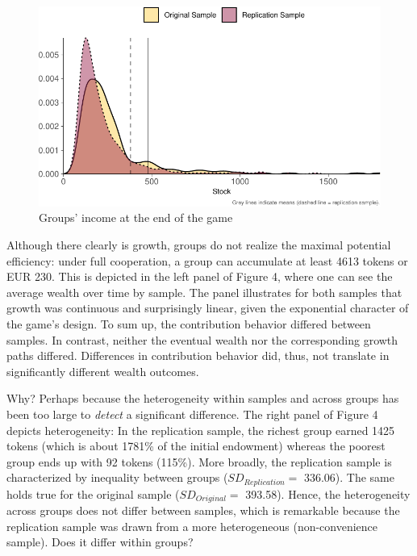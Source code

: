 \documentclass[
  authoryear,
  preprint,
  3p]{elsarticle}
\begin{document}
\begin{figure}

{\centering \includegraphics{paper_files/figure-pdf/stockDistributionViz-1.pdf}

}

\caption{Groups' income at the end of the game}

\end{figure}

Although there clearly is growth, groups do not realize the maximal
potential efficiency: under full cooperation, a group can accumulate at
least 4613 tokens or EUR 230. This is depicted in the left panel of
Figure 4, where one can see the average wealth over time by sample. The
panel illustrates for both samples that growth was continuous and
surprisingly linear, given the exponential character of the game's
design. To sum up, the contribution behavior differed between samples.
In contrast, neither the eventual wealth nor the corresponding growth
paths differed. Differences in contribution behavior did, thus, not
translate in significantly different wealth outcomes.

Why? Perhaps because the heterogeneity within samples and across groups
has been too large to \emph{detect} a significant difference. The right
panel of Figure 4 depicts heterogeneity: In the replication sample, the
richest group earned 1425 tokens (which is about 1781\% of the initial
endowment) whereas the poorest group ends up with 92 tokens (115\%).
More broadly, the replication sample is characterized by inequality
between groups (\(SD_{Replication} =\) 336.06). The same holds true for
the original sample (\(SD_{Original} =\) 393.58). Hence, the
heterogeneity across groups does not differ between samples, which is
remarkable because the replication sample was drawn from a more
heterogeneous (non-convenience sample). Does it differ within groups?
\end{document}

